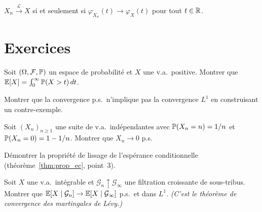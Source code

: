 \begin{theoreme}
\label{thm:levy}
$X_n \xrightarrow{\mathcal{L}} X$ si et seulement si $\varphi_{X_n}(t) \to \varphi_X(t)$
pour tout $t \in \mathbb{R}$.
\end{theoreme}

\section{Exercices}

\begin{exercice}
Soit $(\Omega, \mathcal{F}, \mathbb{P})$ un espace de probabilit\'e et $X$ une v.a.\ positive.
Montrer que $\mathbb{E}[X] = \int_0^{\infty} \mathbb{P}(X > t) \, dt$.
\end{exercice}

\begin{exercice}
Montrer que la convergence p.s.\ n'implique pas la convergence $L^1$ en construisant
un contre-exemple.
\end{exercice}

\begin{exercice}
Soit $(X_n)_{n \geq 1}$ une suite de v.a.\ ind\'ependantes avec
$\mathbb{P}(X_n = n) = 1/n$ et $\mathbb{P}(X_n = 0) = 1 - 1/n$. Montrer que $X_n \to 0$ p.s.
\end{exercice}

\begin{exercice}
D\'emontrer la propri\'et\'e de lissage de l'esp\'erance conditionnelle
(th\'eor\`eme~\ref{thm:prop_ec}, point~3).
\end{exercice}

\begin{exercice}
Soit $X$ une v.a.\ int\'egrable et $\mathcal{G}_n \uparrow \mathcal{G}_{\infty}$
une filtration croissante de sous-tribus. Montrer que
$\mathbb{E}[X \mid \mathcal{G}_n] \to \mathbb{E}[X \mid \mathcal{G}_{\infty}]$ p.s.\ et dans $L^1$.
\emph{(C'est le th\'eor\`eme de convergence des martingales de L\'evy.)}
\end{exercice}
